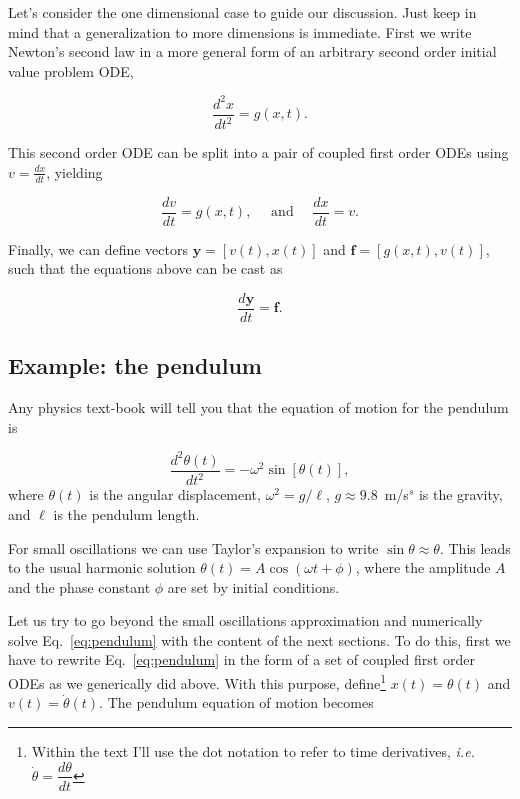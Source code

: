 Let's consider the one dimensional case to guide our discussion. Just keep in mind that a generalization to more dimensions is immediate. First we write Newton's second law in a more general form of an arbitrary second order initial value problem ODE,

\begin{equation}
 \dfrac{d^2 x}{dt^2} = g(x,t).
\end{equation}

This second order ODE can be split into a pair of coupled first order ODEs using $v = \frac{dx}{dt}$, yielding

\begin{equation}
 \dfrac{dv}{dt} = g(x,t), \quad \text{ and } \quad \dfrac{dx}{dt} = v.
\end{equation}

Finally, we can define vectors $\bm{y} = [ v(t), x(t) ]$ and $\bm{f} = [ g(x,t), v(t) ]$, such that the equations above can be cast as

\begin{equation}
 \dfrac{d \bm{y}}{dt} = \bm{f}.
 \label{eq:dydteqf}
\end{equation}


\subsection*{Example: the pendulum}

Any physics text-book will tell you that the equation of motion for the pendulum is

\begin{equation}
 \dfrac{d^2\theta(t)}{dt^2} = -\omega^2 \sin[\theta(t)],
 \label{eq:pendulum}
\end{equation}
where $\theta(t)$ is the angular displacement, $\omega^2 = g/\ell$, $g \approx 9.8$~m/s$^s$ is the gravity, and $\ell$ is the pendulum length.

For small oscillations we can use Taylor's expansion to write $\sin\theta \approx \theta$. This leads to the usual harmonic solution $\theta(t) = A\cos(\omega t + \phi)$, where the amplitude $A$ and the phase constant $\phi$ are set by initial conditions.

Let us try to go beyond the small oscillations approximation and numerically solve Eq.~\eqref{eq:pendulum} with the content of the next sections. To do this, first we have to rewrite Eq.~\eqref{eq:pendulum} in the form of a set of coupled first order ODEs as we generically did above. With this purpose, define\footnote{Within the text I'll use the dot notation to refer to time derivatives, \textit{i.e.} $\dot{\theta} = \dfrac{d\theta}{dt}$} $x(t) = \theta(t)$ and $v(t) = \dot{\theta}(t)$. The pendulum equation of motion becomes

